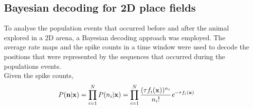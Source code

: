 \subsection{Bayesian decoding for 2D place fields}
To analyse the population events that occurred before and after the animal explored in a 2D arena, a Bayesian decoding approach was employed. The average rate maps and the spike counts in a time window were used to decode the positions that were represented by the sequences that occurred during the populations events. \\
Given the spike counts, 
\[ 
P(\mathbf{n} | \mathbf{x}) = \prod_{i = 1}^{N} P(n_{i} | \mathbf{x}) = \prod_{i = 1}^{N} \frac{(\tau f_{i}(\mathbf{x}))^{n_{i}}}{n_{i} !} \emph{e}^{-\tau f_{i}(\mathbf{x})}
 \]


	
